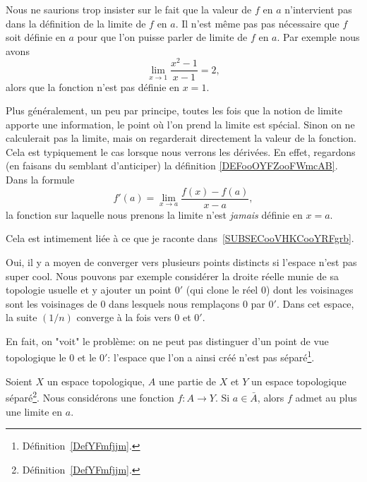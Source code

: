 \begin{remark}
    Nous ne saurions trop insister sur le fait que la valeur de \( f\) en \( a\) n'intervient pas dans la définition de la limite de \( f\) en \( a\). Il n'est même pas pas nécessaire que \( f\) soit définie en \( a\) pour que l'on puisse parler de limite de \( f\) en \( a\). Par exemple nous avons
    \begin{equation}
        \lim_{x\to 1} \frac{ x^2-1 }{ x-1 }=2,
    \end{equation}
    alors que la fonction n'est pas définie en \( x=1\).

    Plus généralement, un peu par principe, toutes les fois que la notion de limite apporte une information, le point où l'on prend la limite est spécial. Sinon on ne calculerait pas la limite, mais on regarderait directement la valeur de la fonction. Cela est typiquement le cas lorsque nous verrons les dérivées. En effet, regardons (en faisans du semblant d'anticiper) la définition  \eqref{DEFooOYFZooFWmcAB}. Dans la formule
    \begin{equation}
        f'(a)=\lim_{x\to a} \frac{ f(x)-f(a) }{ x-a },
    \end{equation}
    la fonction sur laquelle nous prenons la limite n'est \emph{jamais} définie en \( x=a\).

    Cela est intimement liée à ce que je raconte dans~\ref{SUBSECooVHKCooYRFgrb}.
\end{remark}


\begin{example} \label{EXooSHKAooZQEVLB}
    Oui, il y a moyen de converger vers plusieurs points distincts si l'espace n'est pas super cool. Nous pouvons par exemple\cite{EJVQuas} considérer la droite réelle munie de sa topologie usuelle et y ajouter un point $0'$ (qui clone le réel $0$) dont les voisinages sont les voisinages de $0$ dans lesquels nous remplaçons $0$ par $0'$. Dans cet espace, la suite $(1/n)$ converge à la fois vers $0$ et $0'$.

    En fait, on "voit" le problème: on ne peut pas distinguer d'un point de vue topologique le $0$ et le $0'$: l'espace que l'on a ainsi créé n'est pas séparé\footnote{Définition~\ref{DefYFmfjjm}.}.
\end{example}



\begin{proposition}\label{PropFObayrf}
    Soient \( X\) un espace topologique, \( A\) une partie de \( X\) et \( Y\) un espace topologique séparé\footnote{Définition~\ref{DefYFmfjjm}.}. Nous considérons une fonction \( f\colon A\to Y\). Si \( a\in\bar A\), alors \( f\) admet au plus une limite en \( a\).
\end{proposition}

